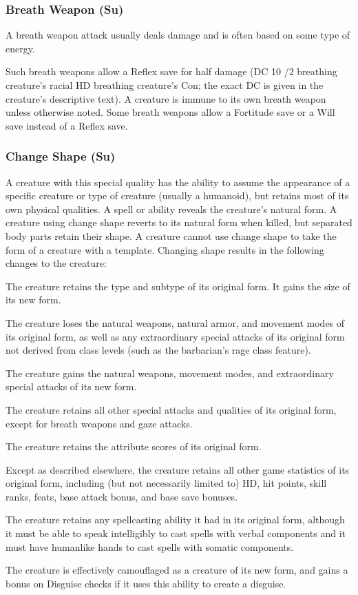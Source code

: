 \subsubsection{Breath Weapon (Su)} A breath weapon attack usually deals damage and is often based on some type of energy.
\par Such breath weapons allow a Reflex save for half damage (DC 10 /2 breathing creature's racial HD \add breathing creature's Con; the exact DC is given in the creature's descriptive text). A creature is immune to its own breath weapon unless otherwise noted. Some breath weapons allow a Fortitude save or a Will save instead of a Reflex save.

\subsubsection{Change Shape (Su)} A creature with this special quality has the ability to assume the appearance of a specific creature or type of creature (usually a humanoid), but retains most of its own physical qualities. A  spell or ability reveals the creature's natural form. A creature using change shape reverts to its natural form when killed, but separated body parts retain their shape. A creature cannot use change shape to take the form of a creature with a template. Changing shape results in the following changes to the creature:
\begin{itemize*}
\item The creature retains the type and subtype of its original form. It gains the size of its new form.
\item The creature loses the natural weapons, natural armor, and movement modes of its original form, as well as any extraordinary special attacks of its original form not derived from class levels (such as the barbarian's rage class feature).
\item The creature gains the natural weapons, movement modes, and extraordinary special attacks of its new form.
\item The creature retains all other special attacks and qualities of its original form, except for breath weapons and gaze attacks.
\item The creature retains the attribute scores of its original form.
\item Except as described elsewhere, the creature retains all other game statistics of its original form, including (but not necessarily limited to) HD, hit points, skill ranks, feats, base attack bonus, and base save bonuses. 
\item The creature retains any spellcasting ability it had in its original form, although it must be able to speak intelligibly to cast spells with verbal components and it must have humanlike hands to cast spells with somatic components.
\item The creature is effectively camouflaged as a creature of its new form, and gains a   bonus on Disguise checks if it uses this ability to create a disguise.
\end{itemize*}

